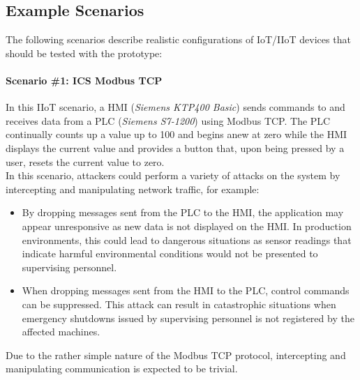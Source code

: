\subsection{Example Scenarios}
The following scenarios describe realistic configurations of \ac{IoT}/\ac{IIoT} devices that should be tested with the prototype:

\paragraph{Scenario \#1: \ac{ICS} Modbus \ac{TCP}}
In this \ac{IIoT} scenario, a \ac{HMI} (\emph{Siemens KTP400 Basic}) sends commands to and receives data from a \ac{PLC} (\emph{Siemens S7-1200}) using Modbus \ac{TCP}. The \ac{PLC} continually counts up a value up to 100 and begins anew at zero while the \ac{HMI} displays the current value and provides a button that, upon being pressed by a user, resets the current value to zero. \\
In this scenario, attackers could perform a variety of attacks on the system by intercepting and manipulating network traffic, for example:
\begin{itemize}
    \item By dropping messages sent from the \ac{PLC} to the \ac{HMI}, the application may appear unresponsive as new data is not displayed on the \ac{HMI}. In production environments, this could lead to dangerous situations as sensor readings that indicate harmful environmental conditions would not be presented to supervising personnel. 
    \item When dropping messages sent from the \ac{HMI} to the \ac{PLC}, control commands can be suppressed. This attack can result in catastrophic situations when emergency shutdowns issued by supervising personnel is not registered by the affected machines.
\end{itemize}

Due to the rather simple nature of the Modbus \ac{TCP} protocol, intercepting and manipulating communication is expected to be trivial. %


